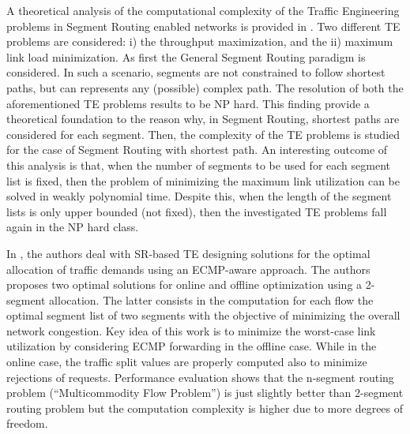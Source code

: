 A theoretical analysis of the computational complexity of the Traffic Engineering problems in Segment Routing enabled networks is provided in \cite{ontraffic}.
Two different TE problems are considered: i) the throughput maximization, and the ii) maximum link load minimization.
As first the General Segment Routing paradigm is considered.
In such a scenario, segments are not constrained to follow shortest paths, but can represents any (possible) complex path.
The resolution of both the aforementioned TE problems results to be NP hard.
This finding provide a theoretical foundation to the reason why, in Segment Routing, shortest paths are considered for each segment.
Then, the complexity of the TE problems is studied for the case of Segment Routing with shortest path.
An interesting outcome of this analysis is that, when the number of segments to be used for each segment list is fixed, then the problem of minimizing the maximum link utilization can be solved in weakly polynomial time.
Despite this, when the length of the segment lists is only upper bounded (not fixed), then the investigated TE problems fall again in the NP hard class.

In \cite{optimizedte}, the authors deal with SR-based TE designing solutions for the optimal allocation of traffic demands using an ECMP-aware approach. The authors proposes two optimal solutions for online and offline optimization using a 2-segment allocation. The latter consists in the computation for each flow the optimal segment list of two segments with the objective of minimizing the overall network congestion. 
Key idea of this work is to minimize the worst-case link utilization by considering ECMP forwarding in the offline case. While in the online case, the traffic split values are properly computed also to minimize rejections of requests. Performance evaluation shows that the n-segment routing problem (``Multicommodity Flow Problem'') is just slightly better than 2-segment routing problem but the computation complexity is higher due to more degrees of freedom. 

